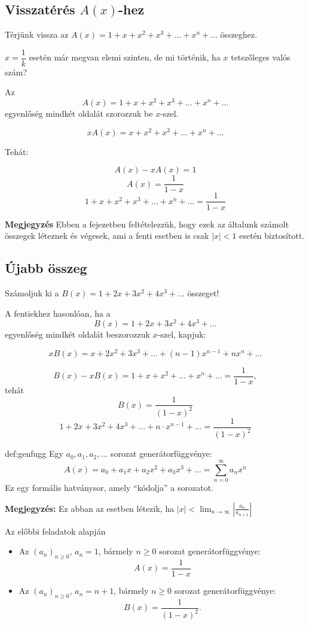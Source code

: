 \subsection*{Visszatérés $A(x)$-hez}

Térjünk vissza az $A(x)=1+x+x^{2}+x^{3}+\dots+x^{n}+\dots$ összeghez.

$x=\dfrac{1}{k}$ esetén már megvan elemi szinten, de mi történik,
ha $x$ tetszőleges valós szám?

Az 
\[
A(x)=1+x+x^{2}+x^{3}+\dots+x^{n}+\dots
\]
egyenlőség mindkét oldalát szorozzuk be $x$-szel.

\[
xA(x)=x+x^{2}+x^{3}+\dots+x^{n}+\dots
\]

Tehát:

\[
A(x)-xA(x)=1
\]
\[
A(x)=\dfrac{1}{1-x}
\]
\[
1+x+x^{2}+x^{3}+\dots+x^{n}+\dots=\dfrac{1}{1-x}
\]

\textbf{Megjegyzés} Ebben a fejezetben feltételezzük, hogy ezek az
általunk számolt összegek léteznek és végesek, ami a fenti esetben
is csak $|x|<1$ esetén biztosított. 

\subsection*{Újabb összeg}

\begin{problem}
Számoljuk ki a $B(x)=1+2x+3x^{2}+4x^{3}+\dots$ összeget!
\end{problem}
\begin{solution}
A fentiekhez hasonlóan, ha a 
\[
B(x)=1+2x+3x^{2}+4x^{3}+\dots
\]
egyenlőség mindkét oldalát beszorozzuk $x$-szel, kapjuk:

\[
xB(x)=x+2x^{2}+3x^{3}+\dots+(n-1)x^{n-1}+nx^{n}+\dots
\]

\[
B(x)-xB(x)=1+x+x^{2}+\dots+x^{n}+\dots=\dfrac{1}{1-x},
\]
tehát 
\[
B(x)=\dfrac{1}{(1-x)^{2}}
\]
\[
1+2x+3x^{2}+4x^{3}+...+n\cdot x^{n-1}+\dots=\dfrac{1}{(1-x)^{2}}
\]
\end{solution}
\begin{definition}{def:genfugg}
Egy $a_{0},a_{1},a_{2},\dots$ sorozat generátorfüggvénye: 
\[
A(x)=a_{0}+a_{1}x+a_{2}x^{2}+a_{3}x^{3}+\dots=\sum_{n=0}^{\infty}a_{n}x^{n}
\]
Ez egy formális hatványsor, amely ``kódolja'' a sorozatot.
\end{definition}
\textbf{Megjegyzés:} Ez abban az esetben létezik, ha ${\displaystyle |x|<\lim_{n\to\infty}\left|\frac{a_{n}}{a_{n+1}}\right|}$

\begin{example}
Az előbbi feladatok alapján 
\begin{itemize}
\item Az $\left(a_{n}\right)_{n\geq0}$, $a_{n}=1$, bármely $n\geq0$ sorozat
generátorfüggvénye: 
\[
A(x)=\dfrac{1}{1-x}
\]
\item Az $\left(a_{n}\right)_{n\geq0}$, $a_{n}=n+1$, bármely $n\geq0$
sorozat generátorfüggvénye: 
\[
B(x)=\dfrac{1}{(1-x)^{2}}.
\]
\end{itemize}
\end{example}

